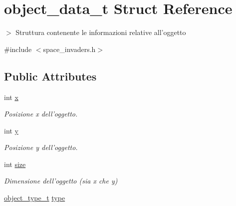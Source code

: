 \hypertarget{structobject__data__t}{
\section{object\_\-data\_\-t Struct Reference}
\label{structobject__data__t}
}


$>$ Struttura contenente le informazioni relative all'oggetto  




{\ttfamily \#include $<$space\_\-invaders.h$>$}

\subsection*{Public Attributes}
\begin{DoxyCompactItemize}
\item 
\hypertarget{structobject__data__t_ab0218a91c693c4f5b505535185a0f646}{
int \hyperlink{structobject__data__t_ab0218a91c693c4f5b505535185a0f646}{x}}
\label{structobject__data__t_ab0218a91c693c4f5b505535185a0f646}

\begin{DoxyCompactList}\small\item\em Posizione x dell'oggetto. \item\end{DoxyCompactList}\item 
\hypertarget{structobject__data__t_ae45af4ef1b3711f227bc6bd641a0f2ac}{
int \hyperlink{structobject__data__t_ae45af4ef1b3711f227bc6bd641a0f2ac}{y}}
\label{structobject__data__t_ae45af4ef1b3711f227bc6bd641a0f2ac}

\begin{DoxyCompactList}\small\item\em Posizione y dell'oggetto. \item\end{DoxyCompactList}\item 
\hypertarget{structobject__data__t_adf2ea19b439460538eeda356948d5883}{
int \hyperlink{structobject__data__t_adf2ea19b439460538eeda356948d5883}{size}}
\label{structobject__data__t_adf2ea19b439460538eeda356948d5883}

\begin{DoxyCompactList}\small\item\em Dimensione dell'oggetto (sia x che y) \item\end{DoxyCompactList}\item 
\hypertarget{structobject__data__t_a48fcf5fc14cd1543c847cbd3a13b5c77}{
\hyperlink{space__invaders_8h_a3af7baddc641a3b4f5a9189b589eccf7}{object\_\-type\_\-t} \hyperlink{structobject__data__t_a48fcf5fc14cd1543c847cbd3a13b5c77}{type}}
\label{structobject__data__t_a48fcf5fc14cd1543c847cbd3a13b5c77}


\end{DoxyCompactItemize}
